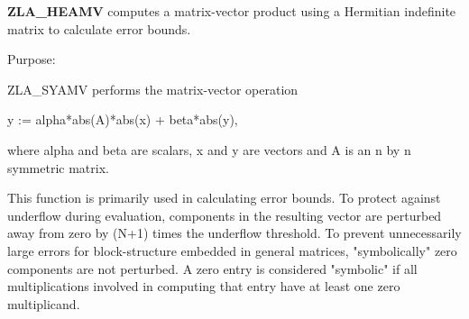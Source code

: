 {\bfseries Z\+L\+A\+\_\+\+H\+E\+A\+M\+V} computes a matrix-\/vector product using a Hermitian indefinite matrix to calculate error bounds. 

 \begin{DoxyParagraph}{Purpose\+: }
\begin{DoxyVerb} ZLA_SYAMV  performs the matrix-vector operation

         y := alpha*abs(A)*abs(x) + beta*abs(y),

 where alpha and beta are scalars, x and y are vectors and A is an
 n by n symmetric matrix.

 This function is primarily used in calculating error bounds.
 To protect against underflow during evaluation, components in
 the resulting vector are perturbed away from zero by (N+1)
 times the underflow threshold.  To prevent unnecessarily large
 errors for block-structure embedded in general matrices,
 "symbolically" zero components are not perturbed.  A zero
 entry is considered "symbolic" if all multiplications involved
 in computing that entry have at least one zero multiplicand.\end{DoxyVerb}
 
\end{DoxyParagraph}

